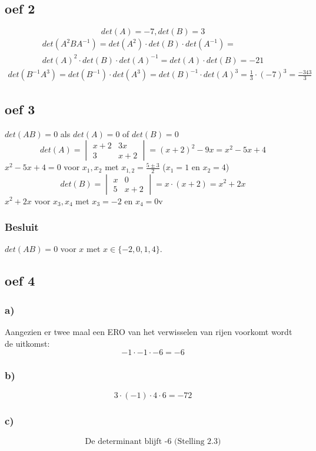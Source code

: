 \documentclass[lineaire_algebra_oplossingen.tex]{subfiles}
\begin{document}
\subsection{oef 2}
\[det(A) = -7, det(B) = 3\]
\begin{gather*}
    det(A^2BA^{-1}) =
    det(A^2) \cdot det(B) \cdot det(A^{-1}) =\\
    det(A)^2 \cdot det(B) \cdot det(A)^{-1} = det(A) \cdot det(B) = -21
\end{gather*}
\begin{gather*}
    det(B^{-1}A^3) = det(B^{-1}) \cdot det(A^3) = det(B)^{-1} \cdot det(A)^3 = \frac{1}{3} \cdot (-7)^3 = \frac{-343}{3}
\end{gather*}

\subsection{oef 3}
$det(AB) = 0$ als $det(A) = 0$ of $det(B) = 0$
\\
\[det(A) = \begin{vmatrix}
x + 2 & 3x\\
3 & x + 2
\end{vmatrix}
 = (x + 2)^2 - 9x = x^2 -5 x + 4
\]
$x^2 -5 x + 4 = 0$ voor $x_1, x_2$ met $x_{1,2} = \frac{5 \pm 3}{2}$ ($x_1 = 1$ en $x_2 = 4$)
\\
\[det(B) = \begin{vmatrix}
x & 0\\
5 & x + 2
\end{vmatrix}
 = x \cdot (x + 2) = x^2 + 2x\]
$x^2 + 2x$ voor $x_3, x_4$ met $x_3 = -2$ en $x_4 = 0$v 
\subsubsection*{Besluit}
$det(AB) = 0$ voor $x$ met $x \in \{-2, 0, 1, 4\}$.
\subsection{oef 4}
\subsubsection*{a)}
Aangezien er twee maal een ERO van het verwisselen van rijen voorkomt wordt de uitkomst:
$$-1\cdot -1\cdot -6 = -6$$
\subsubsection*{b)}
$$3\cdot(-1)\cdot 4 \cdot 6 = -72$$
\subsubsection*{c)}
\[ \text{De determinant blijft -6 (Stelling 2.3)} \]
\end{document}
